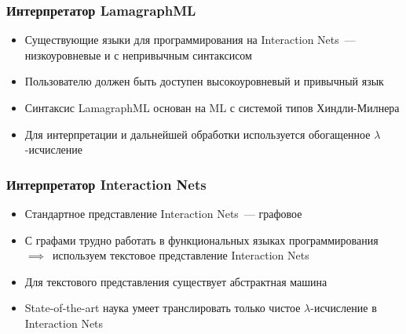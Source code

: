 \documentclass[aspectratio=169]{beamer}
\begin{document}
\begin{frame}
    \frametitle{Интерпретатор LamagraphML}

    \begin{itemize}
        \item Существующие языки для программирования на Interaction Nets~--- низкоуровневые и с непривычным синтаксисом
        \item Пользователю должен быть доступен высокоуровневый и привычный язык
        \item Синтаксис LamagraphML основан на ML с системой типов Хиндли-Милнера
        \item[{\faLightbulb[regular]}] Для интерпретации и дальнейшей обработки используется обогащенное $\lambda$-исчисление
    \end{itemize}
\end{frame}

\begin{frame}
    \frametitle{Интерпретатор Interaction Nets}

    \begin{itemize}
        \item Стандартное представление Interaction Nets~--- графовое
        \item С графами трудно работать в функциональных языках программирования $\implies$~используем текстовое представление Interaction Nets
        \item Для текстового представления существует абстрактная машина
        \item[{\faFrown[regular]}] State-of-the-art наука умеет транслировать только чистое $\lambda$-исчисление в Interaction Nets
    \end{itemize}

\end{frame}
\end{document}

